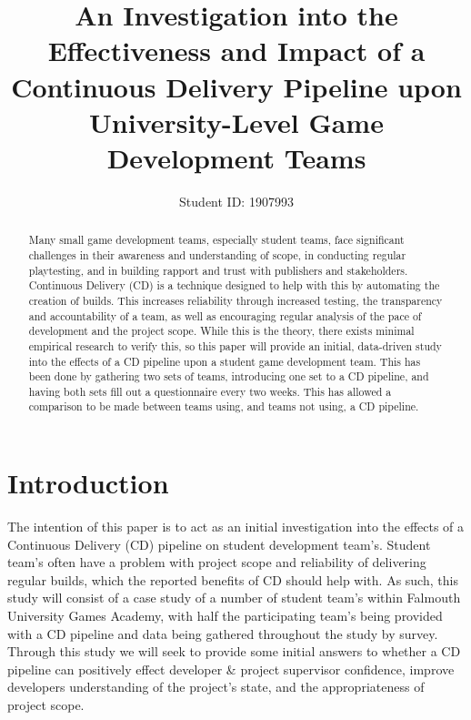 \documentclass[journal]{IEEEtran}
\begin{document}
\title{An Investigation into the Effectiveness and Impact of a Continuous Delivery Pipeline upon University-Level Game Development Teams}

\author{Student ID: 1907993}

\maketitle

\begin{abstract}
    Many small game development teams, especially student teams, face significant challenges in their awareness and understanding of scope, in conducting regular playtesting, and in building rapport and trust with publishers and stakeholders. Continuous Delivery (CD) is a technique designed to help with this by automating the creation of builds. This increases reliability through increased testing, the transparency and accountability of a team, as well as encouraging regular analysis of the pace of development and the project scope. While this is the theory, there exists minimal empirical research to verify this, so this paper will provide an initial, data-driven study into the effects of a CD pipeline upon a student game development team. This has been done by gathering two sets of teams, introducing one set to a CD pipeline, and having both sets fill out a questionnaire every two weeks. This has allowed a comparison to be made between teams using, and teams not using, a CD pipeline.
\end{abstract}

\section{Introduction}
The intention of this paper is to act as an initial investigation into the effects of a Continuous Delivery (CD) pipeline on student development team's. Student team's often have a problem with project scope and reliability of delivering regular builds, which the reported benefits of CD should help with. As such, this study will consist of a case study of a number of student team's within Falmouth University Games Academy, with half the participating team's being provided with a CD pipeline and data being gathered throughout the study by survey. Through this study we will seek to provide some initial answers to whether a CD pipeline can positively effect developer \& project supervisor confidence, improve developers understanding of the project's state, and the appropriateness of project scope.
\end{document}
